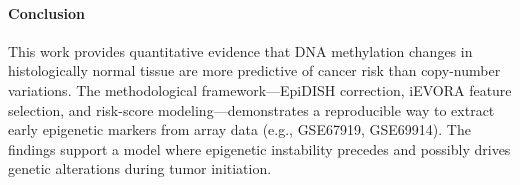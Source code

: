 \documentclass[10pt]{extarticle}
\begin{document}
\paragraph{Conclusion}
This work provides quantitative evidence that DNA methylation changes in histologically normal tissue are more predictive of cancer risk than copy-number variations. The methodological framework—EpiDISH correction, iEVORA feature selection, and risk-score modeling—demonstrates a reproducible way to extract early epigenetic markers from array data (e.g., GSE67919, GSE69914). The findings support a model where epigenetic instability precedes and possibly drives genetic alterations during tumor initiation.



\printbibliography
\end{document}
